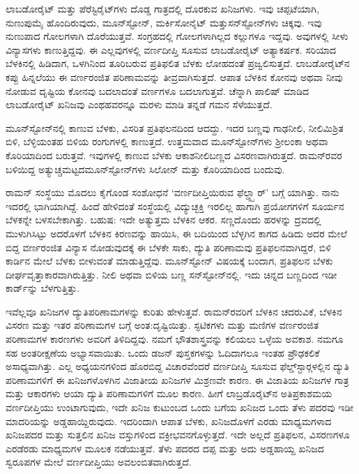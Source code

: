 ಲಾಬಡೋರೈಟ್ ಮತ್ತು ಪೆರೆಸ್ಟಿರೈಟ್‍ಗಳು ದೊಡ್ಡ ಗಾತ್ರದಲ್ಲಿ ದೊರಕುವ ಖನಿಜಗಳು. ಇವು ಚಪ್ಪಟೆಯಾಗಿ, ನುಣುಪುಮೈ ಹೊಂದಿರುವುದು, ಮೂನ್‍ಸ್ಟೋನ್, ಮರ್ಕಿಸೋನೈಟ್ ಮತ್ತು\break ಸನ್‍ಸ್ಟೋನ್‍ಗಳು ಚಿಕ್ಕವು. ಇವು ನುಣುಪಾದ ಗೋಲಗಳಾಗಿ ದೊರೆಯುತ್ತವೆ. ಸಂಗ್ರಹದಲ್ಲಿ ಗೋಲಗಳಾಗಿಲ್ಲದ ಕಲ್ಲುಗಳೂ ಇದ್ದವು. ಅವುಗಳಲ್ಲಿ ಸೀಳು ವಿನ್ಯಾಸಗಳು ಕಾಣುತ್ತಿದ್ದವು. ಈ ಎಲ್ಲವುಗಳಲ್ಲಿ ವರ್ಣದೀಪ್ತಿ ಸೂಸುವ ಲಾಬಡೋರೈಟ್ ಅತ್ಯಾಕರ್ಷಕ. ಸರಿಯಾದ ಬೆಳಕಿನಲ್ಲಿ ಹಿಡಿದಾಗ, ಒಳಗಿನಿಂದ ತೂರಿಬರುವ ಪ್ರತಿಫಲಿತ ಬೆಳಕು ಲೋಹದಂತೆ ಪ್ರಜ್ವಲಿಸುತ್ತದೆ. ಲಾಬಡೋರೈಟ್‍ನ ಕಪ್ಪು ಹಿನ್ನಲೆಯು ಈ ವರ್ಣರಂಜಿತ ಪರಿಣಾಮವನ್ನು ತೀವ್ರವಾಗಿಸುತ್ತದೆ. ಆಪಾತ ಬೆಳಕಿನ ಕೋನವು ಅಥವಾ ನೀವು ನೋಡುವ ದೃಷ್ಟಿಯ ಕೋನವು ಬದಲಾದಂತೆ ವರ್ಣಗಳೂ ಬದಲಾಗುತ್ತವೆ. ಚೆನ್ನಾಗಿ ಪಾಲಿಷ್ ಮಾಡಿದ ಲಾಬಡೋರೈಟ್ ಖನಿಜವು ಎಂಥಹವರನ್ನೂ ಮರಳು ಮಾಡಿ ತನ್ನಡೆ ಗಮನ ಸೆಳೆಯುತ್ತದೆ.

ಮೂನ್‍ಸ್ಟೋನ್‍ನಲ್ಲಿ ಕಾಣುವ ಬೆಳಕು, ವಿಸರಿತ ಪ್ರತಿಫಲನದಿಂದ ಆದದ್ದು. ಇದರ ಬಣ್ಣವು ಗಾಢನೀಲಿ, ನೀಲಿಮಿಶ್ರಿತ ಬಿಳಿ, ಬೆಳ್ಳಿಯಂತಹ ಬಿಳಿಯ ರಂಗುಗಳಲ್ಲಿ ಕಾಣುತ್ತದೆ. ಉತ್ತಮವಾದ ಮೂನ್‍ಸ್ಟೋನ್‍ಗಳು ಶ‍್ರೀಲಂಕಾ ಅಥವಾ ಕೊರಿಯಾದಿಂದ ಬರುತ್ತವೆ. ಇವುಗಳಲ್ಲಿ ಕಾಣುವ ಬೆಳಕು ಆಕಾಶನೀಲಿಬಣ್ಣದ ವಿಸರಣವಾಗಿರುತ್ತದೆ. ರಾಮನ್‍ರವರ ಬಳಿಯಿದ್ದ ಅತ್ಯುಚ್ಚಮಟ್ಟದ\break ಮೂನ್‍ಸ್ಟೋನ್‍ಗಳು ಸಿಲೋನ್ ಮತ್ತು ಕೊರಿಯಾದಿಂದ ಬಂದುವು.

ರಾಮನ್ ಸಂಸ್ಥೆಯು ಮೊದಲು ಕೈಗೊಂಡ ಸಂಶೋಧನೆ ‘ವರ್ಣದೀಪ್ತಿಯಿರುವ ಫೆಲ್ಡ್ಸ್ಪಾರ್’ ಬಗ್ಗೆ ಯಾಗಿತ್ತು. ನಾನು ಇದರಲ್ಲಿ ಭಾಗಿಯಾಗಿದ್ದೆ. ಹಿಂದೆ ಹೇಳಿದಂತೆ ಸಂಸ್ಥೆಯಲ್ಲಿ ವಿದ್ಯುಚ್ಛಕ್ತಿ ಇರಲಿಲ್ಲ ಹಾಗಾಗಿ ಪ್ರಯೋಗಗಳಿಗೆ ಸೂರ್ಯನ ಬೆಳಕನ್ನೇ ಬಳಸಬೇಕಾಗಿತ್ತು. ಬಹುಷ: ಇದೇ ಅತ್ಯುತ್ತಮ ಬೆಳಕಿನ ಆಕರ. ಸಣ್ಣದೊಂದು ಹರಳನ್ನು ದ್ರವದಲ್ಲಿ ಮುಳುಗಿಸಿಟ್ಟು ಅದರೊಳಗೆ ಬೆಳಕಿನ ಕಿರಣವನ್ನು ಹಾಯಿಸಿ, ಈ ಬದಿಯಿಂದ ಬೆಳ್ಳಗಿನ ಕಾಗದ ಹಿಡಿದು ಅದರ ಮೇಲೆ ಬಿದ್ದ ವರ್ಣರಂಜಿತ ವಿನ್ಯಾಸ ನೋಡುವುದಕ್ಕೆ ಈ ಬೆಳಕೇ ಸಾಕು, ದ್ಯುತಿ ಪರಿಣಾಮವು ಪ್ರತಿಫಲನವಾಗಿದ್ದರೆ, ಬಿಳಿ ಕಾರ್ಡಿನ ಮೇಲೆ ಬೆಳಕು ಬೀಳುವಂತೆ ಮಾಡುತ್ತಿದ್ದೆವು. ಮೂನ್‍ಸ್ಟೋನ್ ವಿಷಯಕ್ಕೆ ಬಂದಾಗ, ಪ್ರತಿಫಲನ ಬೆಳಕು ದೀರ್ಘವೃತ್ತಾಕಾರವಾಗಿರುತ್ತಿತ್ತು. ನೀಲಿ ಅಥವಾ ಬಿಳಿಯ ಬಣ್ಣ ಸನ್‍ಸ್ಟೋನ್‍ನಲ್ಲಿ. ಇದು ಚಿನ್ನದ ಬಣ್ಣದಿಂದ ಇಡೀ ಕಾರ್ಡ್‌ನ್ನು ಬೆಳಗುತ್ತಿತ್ತು.

ಇವೆಲ್ಲವೂ ಖನಿಜಗಳ ದ್ಯುತಿಪರಿಣಾಮಗಳನ್ನು ಕುರಿತು ಹೇಳುತ್ತವೆ. ರಾಮನ್‍ರವರಿಗೆ ಬೆಳಕಿನ ಚದರುವಿಕೆ, ಬೆಳಕಿನ ವಿಸರಣ ಮತ್ತು ಇತರ ಪರಿಣಾಮಗಳ ಬಗ್ಗೆ ಅಂತ:ದೃಷ್ಟಿಯಿತ್ತು. ಸ್ಫಟಿಕಗಳು ಮತ್ತು ಮಣಿಗಳ ವರ್ಣರಂಜಿತ ಪರಿಣಾಮಗಳ ಕಾರಣಗಳು ಅವರಿಗೆ ತಿಳಿದಿದ್ದವು. ನಮಗೆ ಭೌತಶಾಸ್ತ್ರವನ್ನು ಕಲಿಯಲು ಒಳ್ಳೆಯ ಅವಕಾಶ. ನಮಗೂ ಸಹ ಅಂತರೀಕ್ಷಣೆಯ ಅಭ್ಯಾಸವಾಯಿತು. ಒಂದು ಡಜನ್ ಪುಸ್ತಕಗಳನ್ನು ಓದಿದಾಗಲೂ ಇಂತಹ ಪ್ರೌಢಕಲಿಕೆ ಅಸಾಧ್ಯವಾಗಿತ್ತು. ಎಲ್ಲ ಅಧ್ಯಯನಗಳಿಂದ ಹೊರಬಿದ್ದ ವಿಚಾರವೆಂದರೆ ವರ್ಣದೀಪ್ತಿ ಸೂಸುವ ಫೆಲ್ಡ್‌ಸ್ಟಾರ್‍ಗಳಲ್ಲಿನ ದ್ಯುತಿ ಪರಿಣಾಮಗಳಿಗೆ ಈ ಖನಿಜಗಳೊಳಗಿನ ವಿಜಾತೀಯ ಖನಿಜಗಳ ಮಿಶ್ರಣವೇ ಕಾರಣ. ಈ ವಿಜಾತಿಯ ಖನಿಜಗಳ ಗಾತ್ರ ಮತ್ತು ಆಕಾರಗಳು ಆಯಾ ದ್ಯುತಿ ಪರಿಣಾಮಗಳಿಗೆ ಮೂಲ ಕಾರಣ. ಹೀಗೆ ಲಾಬ್ರಡೊರೈಟ್‍ನ ಅತಿಪ್ರಕಾಶಮಯ ವರ್ಣದೀಪ್ತಿಯು ಉಂಟಾಗುವುದು, ಇದೇ ಖನಿಜ ಕುಟುಂಬದ ಒಂದು ಬಗೆಯ ಖನಿಜದ ಒಂದು ತೆಳು ಪದರವು ಇಡೀ ಮಾದರಿಯನ್ನು ಅಡ್ಡಹಾಯ್ದಿರುವುದು. ಇದರಿಂದಾಗಿ ಆಪಾತ ಬೆಳಕು, ಖನಿಜದೊಳಗೆ ಎರಡು ಮಾಧ್ಯಮಗಳಾದ ಖನಿಜಪದರ ಮತ್ತು ಸುತ್ತಲಿನ ಖನಿಜ ವಸ್ತುಗಳಿಂದ ವಕ್ರೀಭವನಗೊಳ್ಳುತ್ತದೆ. ಇದೇ ಅಲ್ಲದೆ ಪ್ರತಿಫಲನ, ವಿಸರಣಗಳೂ ಎರಡೆರಡು ಮಾಧ್ಯಮಗಳ ಮೂಲಕ ನಡೆಯುತ್ತವೆ. ತೆಳು ಪದರದ ದಪ್ಪ ಮತ್ತು ಅದು ಅಡ್ಡಹಾಯ್ದ ಖನಿಜದ ಸ್ವರೂಪಗಳ ಮೇಲೆ ವರ್ಣದೀಪ್ತಿಯು ಅವಲಂಬಿತವಾಗಿರುತ್ತದೆ.

